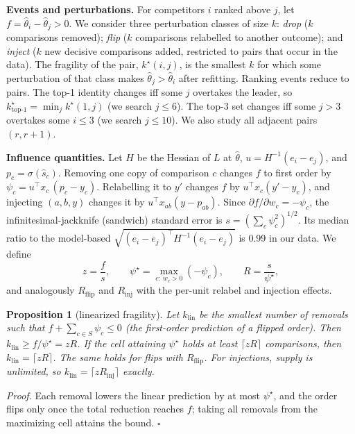\documentclass{article}
\newtheorem{proposition}{Proposition}
\newcommand{\kstar}{k^\star}
\begin{document}
\textbf{Events and perturbations.} For competitors $i$ ranked above $j$, let $f=\hat\theta_i-\hat\theta_j>0$. We consider three perturbation classes of size $k$: \emph{drop} ($k$ comparisons removed); \emph{flip} ($k$ comparisons relabelled to another outcome); and \emph{inject} ($k$ new decisive comparisons added, restricted to pairs that occur in the data). The fragility of the pair, $\kstar(i,j)$, is the smallest $k$ for which some perturbation of that class makes $\hat\theta_j>\hat\theta_i$ after refitting. Ranking events reduce to pairs. The top-1 identity changes iff some $j$ overtakes the leader, so $\kstar_{\text{top-1}}=\min_j \kstar(1,j)$ (we search $j\le 6$). The top-3 set changes iff some $j>3$ overtakes some $i\le3$ (we search $j\le 10$). We also study all adjacent pairs $(r,r{+}1)$.

\textbf{Influence quantities.} Let $H$ be the Hessian of $L$ at $\hat\theta$, $u=H^{-1}(e_i-e_j)$, and $p_c=\sigma(\hat s_c)$. Removing one copy of comparison $c$ changes $f$ to first order by $\psi_c=u^\top x_c\,(p_c-y_c)$. Relabelling it to $y'$ changes $f$ by $u^\top x_c(y'-y_c)$, and injecting $(a,b,y)$ changes it by $u^\top x_{ab}(y-p_{ab})$. Since $\partial f/\partial w_c=-\psi_c$, the infinitesimal-jackknife (sandwich) standard error is $s=(\sum_c\psi_c^2)^{1/2}$. Its median ratio to the model-based $\sqrt{(e_i-e_j)^\top H^{-1}(e_i-e_j)}$ is 0.99 in our data. We define
\begin{equation}
z=\frac{f}{s},\qquad \psi^\star=\max_{c:\,w_c>0}(-\psi_c),\qquad R=\frac{s}{\psi^\star},
\end{equation}
and analogously $R_{\text{flip}}$ and $R_{\text{inj}}$ with the per-unit relabel and injection effects.

\begin{proposition}[linearized fragility]\label{prop:lin}
Let $k_{\mathrm{lin}}$ be the smallest number of removals such that $f+\sum_{c\in S}\psi_c\le 0$ (the first-order prediction of a flipped order). Then $k_{\mathrm{lin}}\ge f/\psi^\star=zR$. If the cell attaining $\psi^\star$ holds at least $\lceil zR\rceil$ comparisons, then $k_{\mathrm{lin}}=\lceil zR\rceil$. The same holds for flips with $R_{\text{flip}}$. For injections, supply is unlimited, so $k_{\mathrm{lin}}=\lceil zR_{\text{inj}}\rceil$ exactly.
\end{proposition}
\emph{Proof.} Each removal lowers the linear prediction by at most $\psi^\star$, and the order flips only once the total reduction reaches $f$; taking all removals from the maximizing cell attains the bound. \hfill$\square$
\end{document}
